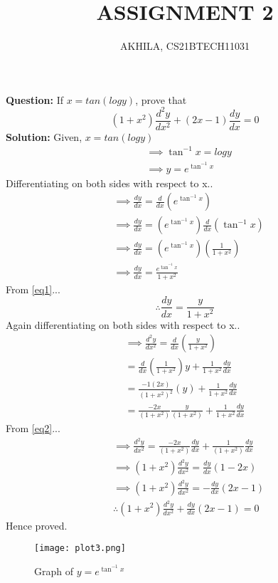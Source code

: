 \documentclass[journal,12pt,twocolumn]{IEEEtran}
\providecommand{\brak}[1]{\ensuremath{\left(#1\right)}}
\newcommand{\question}{\noindent\large \textbf{Question: }}
\newcommand{\solution}{\noindent\large \textbf{Solution: }}
\begin{document}
\title{ASSIGNMENT 2}
\author{AKHILA, CS21BTECH11031}

\maketitle
\question
If $x=tan\brak{logy}$, prove that 
\begin{equation*}
    \brak{1+x^2}\frac{d^2y}{d x^2}+\brak{2x-1}\frac{dy}{dx}=0
\end{equation*}
\solution
Given, $x=tan\brak{logy}$
\begin{align}
    &\implies \tan^{-1} x =logy\\
    &\implies y= e^{\tan^{-1}x}\label{eq1}
\end{align}
Differentiating on both sides with respect to x..
\begin{align}
     &\implies\frac{dy}{dx}= \frac{d}{dx}\brak{e^{\tan^{-1} x}}\\
     &\implies\frac{dy}{dx}=\brak{e^{\tan^{-1} x}}\frac{d}{dx}\brak{\tan^{-1} x}\\
     &\implies\frac{dy}{dx}=\brak{e^{\tan^{-1} x}}\brak{\frac{1}{1+x^2}}\\
     &\implies\frac{dy}{dx}=\frac{ e^{\tan^{-1} x}}{1+x^2}
\end{align}
From \eqref{eq1}...
\begin{equation}
\label{eq2}
     \therefore \frac{dy}{dx} = \frac{y}{1+x^2} 
\end{equation}
Again differentiating on both sides with respect to x..
\begin{align}
    \implies\frac{d^2y}{dx^2} =\frac{d}{dx}\brak{\frac{y}{1+x^2}}\\
    =\frac{d}{dx}\brak{\frac{1}{1+x^2}}y+\frac{1}{1+x^2}\frac{dy}{dx} \\
    =\frac{-1(2x)}{\brak{1+x^2}^2} \brak{y}+\frac{1}{1+x^2}\frac{dy}{dx} \\
    =\frac{-2x}{(1+x^2)}\frac{y}{(1+x^2)} +\frac{1}{1+x^2}\frac{dy}{dx} 
\end{align}
From \eqref{eq2}...
\begin{align}
    &\implies \frac{d^2y}{dx^2}=\frac{-2x}{\brak{1+x^2}}\frac{dy}{dx} +\frac{1}{\brak{1+x^2}}\frac{dy}{dx} \\
    &\implies \brak{1+x^2}\frac{d^2y}{dx^2}=\frac{dy}{dx}\brak{1-2x}\\
    &\implies \brak{1+x^2}\frac{d^2y}{dx^2}=-\frac{dy}{dx}\brak{2x-1}\\
    &\therefore \brak{1+x^2}\frac{d^2y}{dx^2}+\frac{dy}{dx}\brak{2x-1}=0
\end{align}
     Hence proved.
\begin{figure}[H]
    \centering
    \texttt{[image: plot3.png]}
    \captionsetup{justification=centering,margin=1cm}
    \caption{Graph of $y= e^{\tan^{-1}x}$}
    \label{fig:plot3}
\end{figure}
\end{document}
